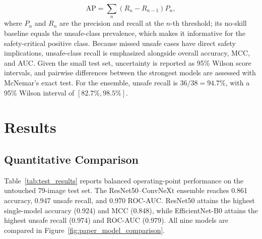 \documentclass{article}
\begin{document}
\begin{equation}
\mathrm{AP} = \sum_{n} \left(R_n - R_{n-1}\right) P_n, \label{eq:ap}
\end{equation}
where $P_n$ and $R_n$ are the precision and recall at the $n$-th threshold; its no-skill baseline equals the unsafe-class prevalence, which makes it informative for the safety-critical positive class. Because missed unsafe cases have direct safety implications, unsafe-class recall is emphasized alongside overall accuracy, MCC, and AUC. Given the small test set, uncertainty is reported as 95\% Wilson score intervals, and pairwise differences between the strongest models are assessed with McNemar's exact test. For the ensemble, unsafe recall is $36/38=94.7\%$, with a 95\% Wilson interval of $[82.7\%,98.5\%]$.


\section{Results}
\subsection{Quantitative Comparison}
Table~\ref{tab:test_results} reports balanced operating-point performance on the untouched 79-image test set. The ResNet50--ConvNeXt ensemble reaches 0.861 accuracy, 0.947 unsafe recall, and 0.970 ROC-AUC. ResNet50 attains the highest single-model accuracy (0.924) and MCC (0.848), while EfficientNet-B0 attains the highest unsafe recall (0.974) and ROC-AUC (0.979). All nine models are compared in Figure~\ref{fig:paper_model_comparison}.
\end{document}
